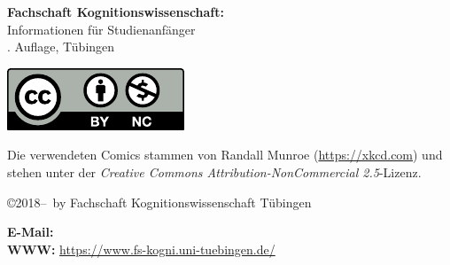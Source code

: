 \thispagestyle{empty}

\textbf{Fachschaft Kognitionswissenschaft:}\\
Informationen für Studienanfänger\\
\number\auflage. Auf\/lage, Tübingen \number\jahr\\[1cm]
    
\vfill
\begin{minipage}[c]{0.1\textwidth}
	\includegraphics[width=\linewidth]{kogni/logos/by-nc.pdf}
\end{minipage}
\begin{minipage}[c]{0.9\textwidth}
	Die verwendeten Comics stammen von Randall Munroe (\url{https://xkcd.com}) und stehen unter der \emph{Creative Commons Attribution-NonCommercial 2.5}-Lizenz. 
\end{minipage}

\copyright 2018--\number\jahr~by Fachschaft Kognitionswissenschaft Tübingen\\

\medskip

\textbf{E-Mail:} \hfill
{}\\
\textbf{WWW:} \hfill
\url{https://www.fs-kogni.uni-tuebingen.de/}
\newpage